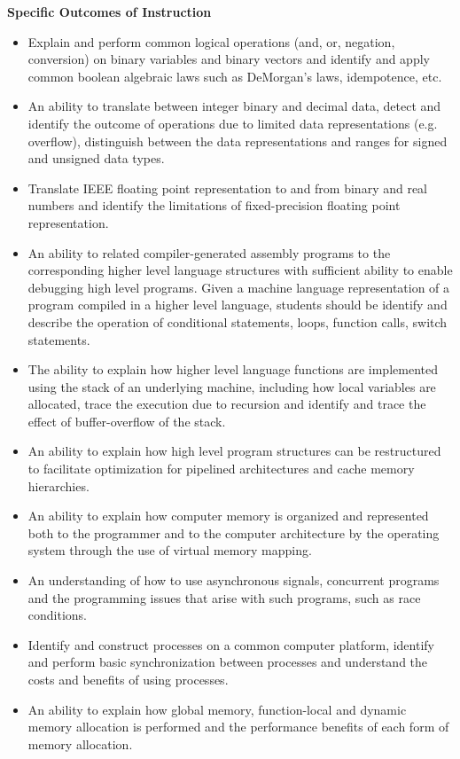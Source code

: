{    \noindent \textbf{Specific Outcomes of Instruction}
    \begin{itemize}
        \item Explain and perform common logical operations (and, or, negation, conversion) on binary variables and binary vectors and identify and apply common boolean algebraic laws such as DeMorgan’s laws, idempotence, etc.
        \item An ability to translate between integer binary and decimal data, detect and identify the outcome of operations due to limited data representations (e.g. overflow), distinguish between the data representations and ranges for signed and unsigned data types.
        \item Translate IEEE floating point representation to and from binary and real numbers and identify the limitations of fixed-precision floating point representation.
        \item An ability to related compiler-generated assembly programs to the corresponding higher level language structures with sufficient ability to enable debugging high level programs. Given a machine language representation of a program compiled in a higher level language, students should be identify and describe the operation of conditional statements, loops, function calls, switch statements.
        \item The ability to explain how higher level language functions are implemented using the stack of an underlying machine, including how local variables are allocated, trace the execution due to recursion and identify and trace the effect of buffer-overflow of the stack.
        \item An ability to explain how high level program structures can be restructured to facilitate optimization for pipelined architectures and cache memory hierarchies.
        \item An ability to explain how computer memory is organized and represented both to the programmer and to the computer architecture by the operating system through the use of virtual memory mapping.
        \item An understanding of how to use asynchronous signals, concurrent programs and the programming issues that arise with such programs, such as race conditions.
        \item Identify and construct processes on a common computer platform, identify and perform basic synchronization between processes and understand the costs and benefits of using processes.
        \item An ability to explain how global memory, function-local and dynamic memory allocation is performed and the performance benefits of each form of memory allocation.

\end{itemize}}
